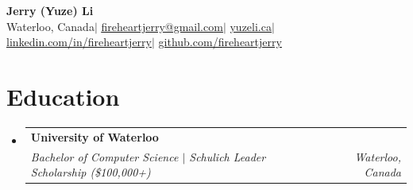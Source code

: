 \documentclass[letterpaper,11pt]{article}
\makeatletter
\newlength{\entrygap}\setlength{\entrygap}{6.5pt}        %
\newenvironment{entries}
  {\begin{itemize}[leftmargin=0.12in, label={}, itemsep=\entrygap, topsep=0pt, parsep=0pt, partopsep=0pt]}
  {\end{itemize}}
\newcommand{\entry}[4]{%
  \item
  \begin{tabular*}{\linewidth}[t]{l@{\extracolsep{\fill}}r}
    \textbf{#1} & #2 \\[-1pt]
    \textit{\small #3} & \textit{\small #4}
  \end{tabular*}}
\newcommand{\link}[2]{\href{#1}{\underline{#2}}}
\makeatother
\begin{document}
\begin{center}
  {\Huge\textbf{Jerry (Yuze) Li}}\\[3pt]
  \small Waterloo, Canada\hspace{0.5em}$|$\hspace{0.5em}%
  \link{mailto:fireheartjerry@gmail.com}{fireheartjerry@gmail.com}\hspace{0.5em}$|$\hspace{0.5em}%
  \link{https://yuzeli.ca}{yuzeli.ca}\hspace{0.5em}$|$\hspace{0.5em}%
  \link{https://linkedin.com/in/fireheartjerry}{linkedin.com/in/fireheartjerry}\hspace{0.5em}$|$\hspace{0.5em}%
  \link{https://github.com/fireheartjerry}{github.com/fireheartjerry}
\end{center}
\vspace{-6pt}

\section{Education}
\begin{entries}
  \entry{University of Waterloo}{}
        {Bachelor of Computer Science $|$ Schulich Leader Scholarship (\$100,000+)}{Waterloo, Canada}
\end{entries}
\end{document}
